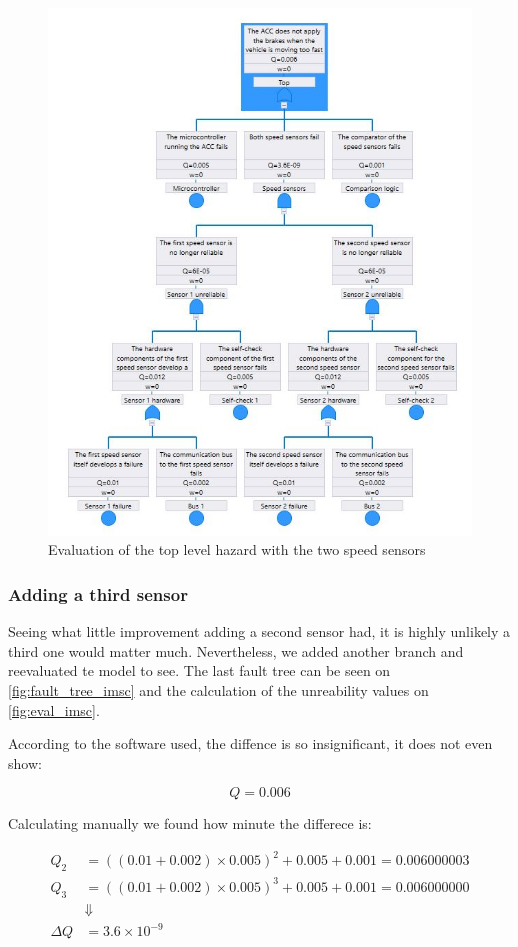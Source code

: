 \documentclass[a4paper]{article}
\begin{document}
\begin{figure}
	\centering
	\includegraphics[width=.5\textwidth]{eval_extended.jpg}
	\caption{Evaluation of the top level hazard with the two speed sensors}%
	\label{fig:eval_extended}
\end{figure}


\subsubsection{Adding a third sensor}

Seeing what little improvement adding a second sensor had, it is highly unlikely
a third one would matter much. Nevertheless, we added another branch and
reevaluated te model to see. The last fault tree can be seen on
\cref{fig:fault_tree_imsc} and the calculation of the unreability values on
\cref{fig:eval_imsc}.

According to the software used, the diffence is so insignificant, it does not
even show:

\[ Q = 0.006 \]

Calculating manually we found how minute the differece is:

\[
	\begin{aligned}
		Q_2 &= {\left((0.01 + 0.002) \times 0.005\right)}^2
		       + 0.005 + 0.001
		     = 0.006000003 \\
		Q_3 &= {\left((0.01 + 0.002) \times 0.005\right)}^3
		       + 0.005 + 0.001
		     = 0.006000000 \\
		& \Downarrow \\
		\Delta Q &= 3.6 \times 10^{-9}
	\end{aligned}
\]
\end{document}

